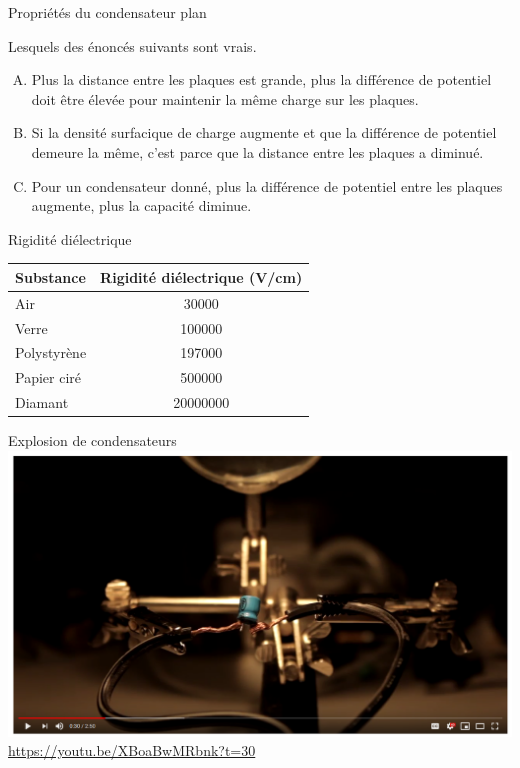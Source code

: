 \documentclass{beamer}
\begin{document}
\begin{frame}[t]{Propriétés du condensateur plan}

Lesquels des énoncés suivants sont vrais.

\begin{enumerate}[A.]
  \item<alert@2> Plus la distance entre les plaques est grande, plus la
    différence de potentiel doit être élevée pour maintenir la même charge sur
    les plaques.
  \item<alert@2> Si la densité surfacique de charge augmente et que la
    différence de potentiel demeure la même, c'est parce que la distance entre
    les plaques a diminué.
  \item Pour un condensateur donné, plus la différence de potentiel entre les
    plaques augmente, plus la capacité diminue.
\end{enumerate}

\end{frame}


\begin{frame}{Rigidité diélectrique}

\begin{center}
\begin{tabular}{lS}
  \toprule
  Substance       &        {Rigidité diélectrique (\si{V/cm})}     \\
  \midrule
  Air             &  30000  \\
  Verre           &  100000 \\
  Polystyrène     &  197000 \\
  Papier ciré     &  500000 \\
  Diamant         &  20000000 \\
  \bottomrule
\end{tabular}
\end{center}
\end{frame}



\begin{frame}{Explosion de condensateurs}
  \includegraphics[width=\textwidth]{figures/explosion-condensateur.png}
  \url{https://youtu.be/XBoaBwMRbnk?t=30}
\end{frame}
\end{document}
